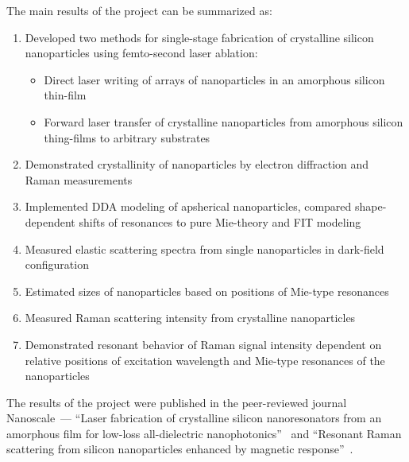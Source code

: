     \clearpage
    The main results of the project can be summarized as:
    \begin{enumerate}
        \item Developed two methods for single-stage fabrication of crystalline silicon nanoparticles using femto-second laser ablation:
            \begin{itemize}
                \item Direct laser writing of arrays of nanoparticles in an amorphous silicon thin-film
                \item Forward laser transfer of crystalline nanoparticles from amorphous silicon thing-films to arbitrary substrates
            \end{itemize}
        \item Demonstrated crystallinity of nanoparticles by electron diffraction and Raman measurements
        \item Implemented DDA modeling of apsherical nanoparticles, compared shape-dependent shifts of resonances to pure Mie-theory
            and FIT modeling
        \item Measured elastic scattering spectra from single nanoparticles in dark-field configuration
        \item Estimated sizes of nanoparticles based on positions of Mie-type resonances
        \item Measured Raman scattering intensity from crystalline nanoparticles
        \item Demonstrated resonant behavior of Raman signal intensity dependent on relative positions of excitation wavelength and Mie-type resonances
            of the nanoparticles
    \end{enumerate}

        The results of the project were published in the peer-reviewed journal Nanoscale~--- ``Laser fabrication of
    crystalline silicon nanoresonators from an amorphous film for low-loss all-dielectric nanophotonics''~ and
    ``Resonant Raman scattering from silicon nanoparticles enhanced by magnetic response''~.

\clearpage
